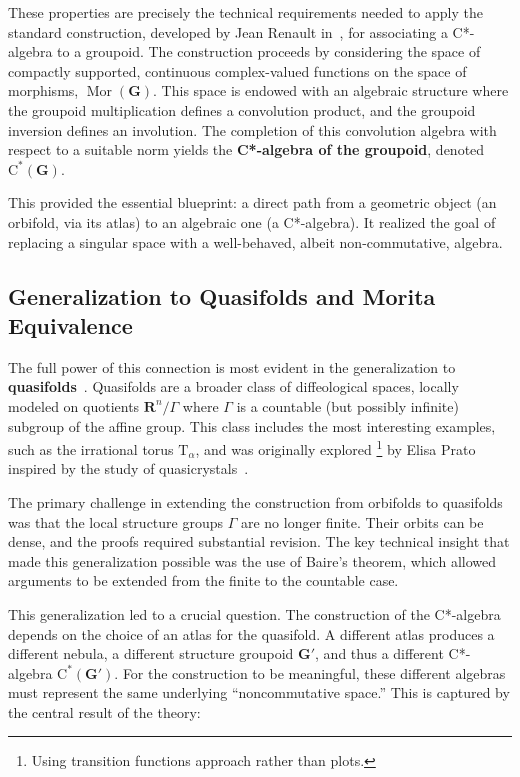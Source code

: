 \documentclass[10pt,reqno,letterpaper,twoside]{amsart}
\theoremstyle{article}
\newcommand{\RR}{\mathbf{R}}
\newcommand{\GG}{\mathbf{G}}
\def \C{\mathrm C}
\def \T{\mathrm T}
\newcommand{\Mor}{\operatorname{Mor}}
\begin{document}
  These properties are precisely the technical requirements needed to apply the standard construction,
  developed by Jean Renault in~\cite{Ren80},
  for associating a C*-algebra to a groupoid.
  The construction proceeds by considering the space of compactly supported,
  continuous complex-valued functions on the space of morphisms,
  $\Mor(\GG)$.
  This space is endowed with an algebraic structure where the groupoid multiplication defines a convolution product, and the groupoid inversion defines an involution.
  The completion of this convolution algebra with respect to a suitable norm yields the \textbf{C*-algebra of the groupoid},
  denoted $\C^*(\GG)$.
  
  This provided the essential blueprint:
  a direct path from a geometric object
  (an orbifold, via its atlas)
  to an algebraic one (a C*-algebra).
  It realized the goal of replacing a singular space with a well-behaved, albeit non-commutative, algebra.
  
  \subsection{Generalization to Quasifolds and Morita Equivalence}
  
  The full power of this connection is most evident in the generalization to \textbf{quasifolds}~\cite{IZP21}.
  Quasifolds are a broader class of diffeological spaces,
  locally modeled on quotients $\RR^n/\Gamma$ where $\Gamma$ is a countable
  (but possibly infinite)
  subgroup of the affine group.
  This class includes the most interesting examples,
  such as the irrational torus $\T_\alpha$,
  and was originally explored%
  \footnote{Using transition functions approach rather than plots.}
  by Elisa Prato inspired by the study of quasicrystals~\cite{Pra99}.
  
  The primary challenge in extending the construction from orbifolds to quasifolds was that the local structure groups $\Gamma$ are no longer finite.
  Their orbits can be dense, and the proofs required substantial revision.
  The key technical insight that made this generalization possible was the use of Baire's theorem,
  which allowed arguments to be extended from the finite to the countable case.
  
  This generalization led to a crucial question.
  The construction of the C*-algebra depends on the choice of an atlas for the quasifold.
  A different atlas produces a different nebula,
  a different structure groupoid $\GG'$, and thus a different C*-algebra $\C^*(\GG')$.
  For the construction to be meaningful,
  these different algebras must represent the same underlying ``noncommutative space.''
  This is captured by the central result of the theory:
  
\end{document}

